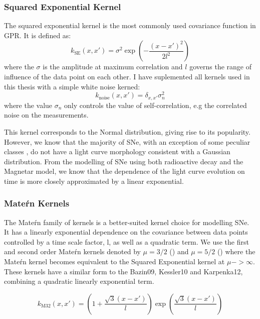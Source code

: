 \subsubsection{Squared Exponential Kernel}
The squared exponential kernel is the most commonly used covariance function in GPR. It is defined as:
\begin{equation}
  k_{\textrm{SE}}(x,x') = \sigma^2 \exp\left(-\frac{(x - x')^2}{2l^2}\right)
\end{equation}
\noindent where the $\sigma$ is the amplitude at maximum correlation and $l$ governs the range of influence of the data point on each other. I have suplemented all kernels used in this thesis with a simple white noise kerned:
\begin{equation}
  k_{\textrm{noise}}(x,x') = \delta_{x,x'}\sigma_n^2
\end{equation}
\noindent where the value $\sigma_n$ only controls the value of self-correlation, e.g the correlated noise on the measurements.

This kernel corresponds to the Normal distribution, giving rise to its popularity. However, we know that the majority of SNe, with an exception of some peculiar classes \citep{Pursiainen2018}, do not have a light curve morphology consistent with a Gaussian distribution. From the modelling of SNe using both radioactive decay and the Magnetar model, we know that the dependence of the light curve evolution on time is more closely approximated by a linear exponential.

\subsubsection{Mate\'rn Kernels}
The Mate\'rn family of kernels is a better-suited kernel choice for modelling SNe. It has a linearly exponential dependence on the covariance between data points controlled by a time scale factor, l, as well as a quadratic term. We use the first and second order Mate\'rn kernels denoted by $\mu = 3/2$ () and $\mu = 5/2$ () where the Mate\'rn kernel becomes equivalent to the Squared Exponential kernel at $\mu -> \infty$. These kernels have a similar form to the Bazin09, Kessler10 and Karpenka12, combining a quadratic linearly exponential term.

\begin{equation} \label{eq:M32}
  k_{\textrm{M32}}(x,x') = \left(1 + \frac{\sqrt{3}(x - x')}{l}\right) \exp \left( \frac{\sqrt{3}(x - x')}{l} \right)
\end{equation}

